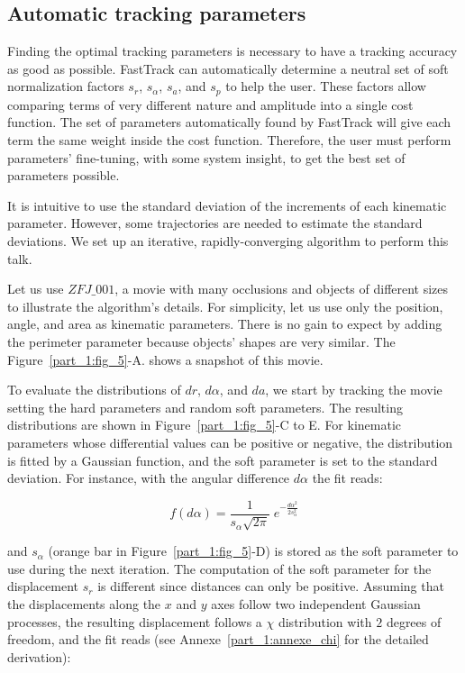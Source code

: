     \subsection{Automatic tracking parameters}
    Finding the optimal tracking parameters is necessary to have a tracking accuracy as good as possible. FastTrack can automatically determine a neutral set of soft normalization factors $s_r$, $s_\alpha$, $s_a$, and $s_p$ to help the user. These factors allow comparing terms of very different nature and amplitude into a single cost function. The set of parameters automatically found by FastTrack will give each term the same weight inside the cost function. Therefore, the user must perform parameters' fine-tuning, with some system insight, to get the best set of parameters possible.

    It is intuitive to use the standard deviation of the increments of each kinematic parameter. However, some trajectories are needed to estimate the standard deviations. We set up an iterative, rapidly-converging algorithm to perform this talk.

    Let us use $ZFJ\_001$, a movie with many occlusions and objects of different sizes to illustrate the algorithm's details. For simplicity, let us use only the position, angle, and area as kinematic parameters. There is no gain to expect by adding the perimeter parameter because objects' shapes are very similar. The Figure~\ref{part_1:fig_5}-A. shows a snapshot of this movie.

    To evaluate the distributions of $dr$, $d\alpha$, and $da$, we start by tracking the movie setting the hard parameters and random soft parameters. The resulting distributions are shown in Figure~\ref{part_1:fig_5}-C to E. For kinematic parameters whose differential values can be positive or negative, the distribution is fitted by a Gaussian function, and the soft parameter is set to the standard deviation. For instance, with the angular difference $d\alpha$ the fit reads:

    \begin{equation}
    f(d\alpha) = \frac{1}{s_\alpha\sqrt{2 \pi}} \; e^{-\frac{d\alpha^2}{2 s_\alpha^2}}
    \label{eq:fit_Gaussian}
    \end{equation}

    \noindent and $s_\alpha$ (orange bar in Figure~\ref{part_1:fig_5}-D) is stored as the soft parameter to use during the next iteration.
    The computation of the soft parameter for the displacement $s_r$ is different since distances can only be positive. Assuming that the displacements along the $x$ and $y$ axes follow two independent Gaussian processes, the resulting displacement follows a $\chi$ distribution with $2$ degrees of freedom, and the fit reads (see Annexe~\ref{part_1:annexe_chi} for the detailed derivation):

